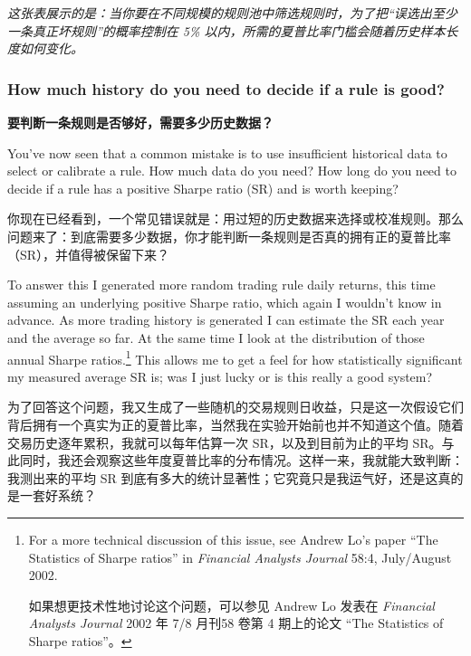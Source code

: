 \begin{chineseblock} \textit{这张表展示的是：当你要在不同规模的规则池中筛选规则时，为了把“误选出至少一条真正坏规则”的概率控制在 5\% 以内，所需的夏普比率门槛会随着历史样本长度如何变化。}\end{chineseblock}

\subsubsection*{How much history do you need to decide if a rule is good?} \medskip \noindent\textbf{要判断一条规则是否够好，需要多少历史数据？} \par \smallskip

\begin{englishblock} You've now seen that a common mistake is to use insufficient historical data to select or calibrate a rule. How much data do you need? How long do you need to decide if a rule has a positive Sharpe ratio (SR) and is worth keeping? \end{englishblock}

\begin{chineseblock}你现在已经看到，一个常见错误就是：用过短的历史数据来选择或校准规则。那么问题来了：到底需要多少数据，你才能判断一条规则是否真的拥有正的夏普比率（SR），并值得被保留下来？\end{chineseblock}

\bipairgap

\begin{englishblock} To answer this I generated more random trading rule daily returns, this time assuming an underlying positive Sharpe ratio, which again I wouldn't know in advance. As more trading history is generated I can estimate the SR each year and the average so far. At the same time I look at the distribution of those annual Sharpe ratios.\footnote{For a more technical discussion of this issue, see Andrew Lo's paper ``The Statistics of Sharpe ratios'' in \textit{Financial Analysts Journal} 58:4, July/August 2002. \par 如果想更技术性地讨论这个问题，可以参见 Andrew Lo 发表在 \textit{Financial Analysts Journal} 2002 年 7/8 月刊58 卷第 4 期上的论文 “The Statistics of Sharpe ratios”。} This allows me to get a feel for how statistically significant my measured average SR is; was I just lucky or is this really a good system? \end{englishblock}

\begin{chineseblock}为了回答这个问题，我又生成了一些随机的交易规则日收益，只是这一次假设它们背后拥有一个真实为正的夏普比率，当然我在实验开始前也并不知道这个值。随着交易历史逐年累积，我就可以每年估算一次 SR，以及到目前为止的平均 SR。与此同时，我还会观察这些年度夏普比率的分布情况。这样一来，我就能大致判断：我测出来的平均 SR 到底有多大的统计显著性；它究竟只是我运气好，还是这真的是一套好系统？\end{chineseblock}

